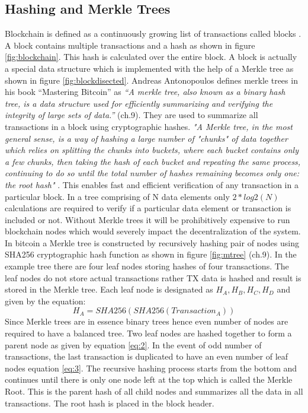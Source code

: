 \subsection{Hashing and Merkle Trees} \label{MerkleTrees}
Blockchain is defined as a continuously growing list of transactions called blocks \cite{wiki:001}. A block contains multiple transactions and a hash as shown in figure \ref{fig:blockchain}. This hash is calculated over the entire block. A block is actually a special data structure which is implemented with the help of a Merkle tree as shown in figure \ref{fig:blockdisected}. Andreas Antonopoulos defines merkle trees in his book “Mastering Bitcoin” as \textit{“A merkle tree, also known as a binary hash tree, is a data structure used for efficiently summarizing and verifying the integrity of large sets of data.”} \cite{andy_mb} (ch.9). They are used to summarize all transactions in a block using cryptographic hashes. \textit{"A Merkle tree, in the most general sense, is a way of hashing a large number of "chunks" of data together which relies on splitting the chunks into buckets, where each bucket contains only a few chunks, then taking the hash of each bucket and repeating the same process, continuing to do so until the total number of hashes remaining becomes only one: the root hash"} \cite{misc:025}. This enables fast and efficient verification of any transaction in a particular block. In a tree comprising of N data elements only \(2*log2 (N)\) calculations are required to verify if a particular data element or transaction is included or not. Without Merkle trees it will be prohibitively expensive to run blockchain nodes which would severely impact the decentralization of the system. 
In bitcoin a Merkle tree is constructed by recursively hashing pair of nodes using SHA256 cryptographic hash function as shown in figure \ref{fig:mtree} \cite{andy_mb} (ch.9).  In the example tree there are four leaf nodes storing hashes of four transactions. The leaf nodes do not store actual transactions rather TX data is hashed and result is stored in the Merkle tree. Each leaf node is designated as \( H_{A}, H_{B}, H_{C}, H_{D} \) and given by the equation: \[ H_{A} = SHA256(SHA256(Transaction_{A}))\]
Since Merkle trees are in essence binary trees hence even number of nodes are required to have a balanced tree. Two leaf nodes are hashed together to form a parent node as given by equation \eqref{eq:2}. In the event of odd number of transactions, the last transaction is duplicated to have an even number of leaf nodes equation \eqref{eq:3}. The recursive hashing process starts from the bottom and continues until there is only one node left at the top which is called the Merkle Root. This is the parent hash of all child nodes and summarizes all the data in all transactions. The root hash is placed in the block header.


